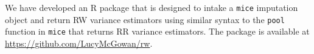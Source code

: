 We have developed an \textsf{R} package that is designed to intake a
\texttt{mice} imputation object and return RW variance estimators using
similar syntax to the \texttt{pool} function in \texttt{mice} that
returns RR variance estimators.  The package is available at
\url{https://github.com/LucyMcGowan/rw}.